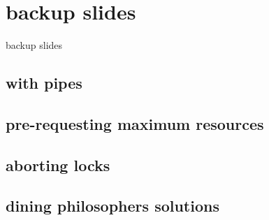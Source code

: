 

\section{backup slides}
\begin{frame}{}
\end{frame}
\begin{frame}{backup slides}
\end{frame}

\subsection{with pipes}


\subsection{pre-requesting maximum resources}



\subsection{aborting locks}



\subsection{dining philosophers solutions}


